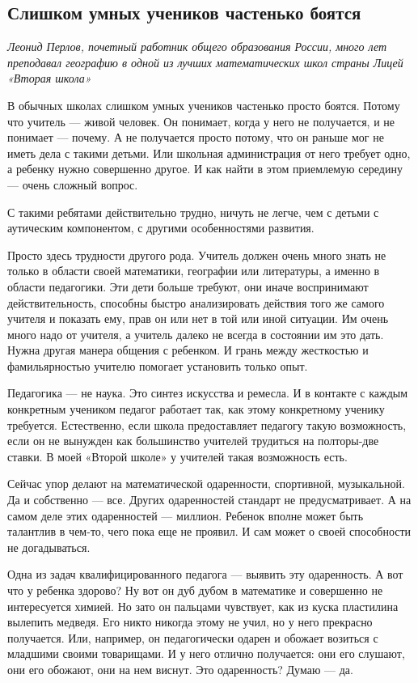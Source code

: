 \subsection{Слишком умных учеников частенько боятся}
\textit{Леонид Перлов, почетный работник общего образования России, много лет преподавал географию в одной из лучших математических школ страны Лицей «Вторая школа»}

В обычных школах слишком умных учеников частенько просто боятся. Потому что учитель --- живой человек. Он понимает, когда у него не получается, и не понимает --- почему. А не получается просто потому, что он раньше мог не иметь дела с такими детьми. Или школьная администрация от него требует одно, а ребенку нужно совершенно другое. И как найти в этом приемлемую середину --- очень сложный вопрос.

С такими ребятами действительно трудно, ничуть не легче, чем с детьми с аутическим компонентом, с другими особенностями развития.

Просто здесь трудности другого рода. Учитель должен очень много знать не только в области своей математики, географии или литературы, а именно в области педагогики. Эти дети больше требуют, они иначе воспринимают действительность, способны быстро анализировать действия того же самого учителя и показать ему, прав он или нет в той или иной ситуации. Им очень много надо от учителя, а учитель далеко не всегда в состоянии им это дать. Нужна другая манера общения с ребенком. И грань между жесткостью и фамильярностью учителю помогает установить только опыт.

Педагогика --- не наука. Это синтез искусства и ремесла. И в контакте с каждым конкретным учеником педагог работает так, как этому конкретному ученику требуется. Естественно, если школа предоставляет педагогу такую возможность, если он не вынужден как большинство учителей трудиться на полторы-две ставки. В моей «Второй школе» у учителей такая возможность есть.

Сейчас упор делают на математической одаренности, спортивной, музыкальной. Да и собственно --- все. Других одаренностей стандарт не предусматривает. А на самом деле этих одаренностей --- миллион. Ребенок вполне может быть талантлив в чем-то, чего пока еще не проявил. И сам может о своей способности не догадываться.

Одна из задач квалифицированного педагога --- выявить эту одаренность. А вот что у ребенка здорово? Ну вот он дуб дубом в математике и совершенно не интересуется химией. Но зато он пальцами чувствует, как из куска пластилина вылепить медведя. Его никто никогда этому не учил, но у него  прекрасно получается. Или, например, он педагогически одарен и обожает возиться с младшими своими товарищами. И у него отлично получается: они его слушают, они его обожают, они на нем виснут. Это одаренность? Думаю --- да.

